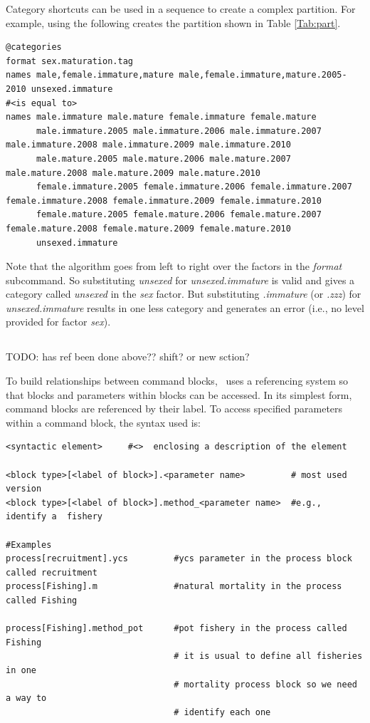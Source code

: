 Category shortcuts can be used in a sequence to create a complex partition. For example, using the following creates the partition shown in Table \ref{Tab:part}.

{\small{\begin{lstlisting}
@categories
format sex.maturation.tag
names male,female.immature,mature male,female.immature,mature.2005-2010 unsexed.immature 
#<is equal to>
names male.immature male.mature female.immature female.mature
      male.immature.2005 male.immature.2006 male.immature.2007 male.immature.2008 male.immature.2009 male.immature.2010
      male.mature.2005 male.mature.2006 male.mature.2007 male.mature.2008 male.mature.2009 male.mature.2010
      female.immature.2005 female.immature.2006 female.immature.2007 female.immature.2008 female.immature.2009 female.immature.2010
      female.mature.2005 female.mature.2006 female.mature.2007 female.mature.2008 female.mature.2009 female.mature.2010      
      unsexed.immature
\end{lstlisting}}}

Note that the algorithm goes from left to right over the factors in the \textit{format} subcommand. So substituting \textit{unsexed} for \textit{unsexed.immature} is valid and gives a category called \textit{unsexed} in the \textit{sex} factor. But substituting \textit{.immature} (or \textit{.zzz}) for \textit{unsexed.immature} results in one less category and generates an error (i.e., no level provided for factor \textit{sex}).

\subsection{\label{sec:params}}

TODO: has ref been done above?? shift? or new sction?

To build relationships between command blocks, \CNAME\ uses  a referencing system so that blocks and parameters within blocks can be accessed. In its simplest form, command blocks are referenced by their label. To access specified parameters within a command block, the syntax used is:

{\small{\begin{verbatim}
<syntactic element>     #<>  enclosing a description of the element

<block type>[<label of block>].<parameter name>         # most used version
<block type>[<label of block>].method_<parameter name>  #e.g., identify a  fishery

#Examples
process[recruitment].ycs         #ycs parameter in the process block called recruitment
process[Fishing].m               #natural mortality in the process called Fishing

process[Fishing].method_pot      #pot fishery in the process called Fishing
                                 # it is usual to define all fisheries in one 
                                 # mortality process block so we need a way to
                                 # identify each one
\end{verbatim}}}


